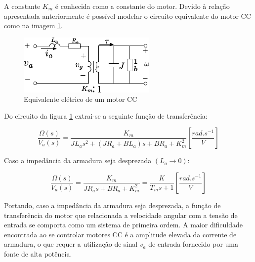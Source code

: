 A constante $K_{m}$ é conhecida como a constante do motor. Devido à relação apresentada anteriormente é possível modelar o circuito equivalente do motor CC como na imagem \ref{fig:eq_eletrico_motorcc}.
\begin{figure}[H]
    \centering
    \includegraphics[width=0.6\textwidth]{figuras/ilustracoes/circuito_equivalente_motor_cc.eps}
    \caption{Equivalente elétrico de um motor CC}
    \label{fig:eq_eletrico_motorcc}
\end{figure}

Do circuito da figura \ref{fig:eq_eletrico_motorcc} extrai-se a seguinte função de transferência:

\begin{equation*}
    \frac{\Omega(s)}{V_a(s)} = \frac{K_m}{JL_{a}s^2 + \left(JR_a + BL_a \right)s + BR_a + K_{m}^2} \left[\frac{ rad.s^{-1}}{V}  \right]
\end{equation*}

Caso a impedância da armadura seja desprezada $(L_a \xrightarrow{} 0)$:

\begin{equation}
    \frac{\Omega(s)}{V_{a}(s)} = \frac{K_m}{JR_{a}s + BR_{a} + K_{m}^2} = \frac{K}{T_{m}s + 1} \left[\frac{ rad.s^{-1}}{V}  \right]
    \label{eq:motor_transf_func}
\end{equation}

Portando, caso a impedância da armadura seja desprezada, a função de transferência do motor que relacionada a velocidade angular com a tensão de entrada se comporta como um sistema de primeira ordem. A maior dificuldade encontrada ao se controlar motores CC é a amplitude elevada da corrente de armadura, o que requer a utilização de sinal $v_a$ de entrada fornecido por uma fonte de alta potência.
